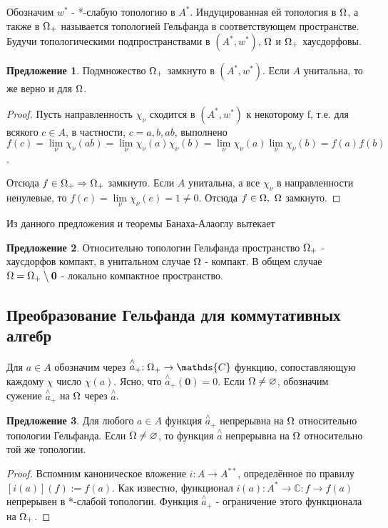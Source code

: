 \documentclass[12pt]{extarticle}
\renewcommand{\setminus}{\mathbin{\big\backslash}}%
\theoremstyle{definition}
\newtheorem{suggestion}{\indent Предложение}[section]
\begin{document}
    Обозначим $w^*$ - *-слабую топологию в $A^*$. Индуцированная ей топология в $\ohm$, а также в $\ohm_+$ называется топологией Гельфанда в соответствующем пространстве. Будучи топологическими подпространствами в $(A^*, w^*)$, $\ohm$ и $\ohm_+$ хаусдорфовы.
    
     \begin{suggestion}
    Подмножество $\ohm_+$ замкнуто в $(A^*, w^*)$. Если $A$ унитальна, то же верно и для $\ohm$.
    \end{suggestion}
    \begin{proof}
    Пусть направленность $\chi_{\nu}$ сходится в $(A^*, w^*)$ к некоторому f, т.е. для всякого $c \in A$, в частности, $c = a, b, ab$, выполнено $f(c) = \lim \limits_{\nu} \chi_{\nu}(ab) = \lim \limits_{\nu} \chi_{\nu}(a)\chi_{\nu}(b) = \lim \limits_{\nu} \chi_{\nu}(a) \lim \limits_{\nu} \chi_{\nu}(b) = f(a)f(b)$.
    
    Отсюда $f\in \ohm_+ \Rightarrow \ohm_+$ замкнуто. Если $A$ унитальна, а все $\chi_{\nu}$ в направленности ненулевые, то $f(e) = \lim \limits_{\nu} \chi_{\nu}(e) = 1 \neq 0$. Отсюда $f \in \ohm,\ \ohm$ замкнуто.
    \end{proof}
    
    Из данного предложения и теоремы Банаха-Алаоглу вытекает 
    
    \begin{suggestion}
    Относительно топологии Гельфанда пространство $\ohm_+$ - хаусдорфов компакт, в унитальном случае $\ohm$ - компакт. В общем случае $\ohm = \ohm_+\setminus \mathbf{0}$ - локально компактное пространство.
    \end{suggestion}
    
    \subsection{Преобразование Гельфанда для коммутативных алгебр}
    
    Для $a \in A$ обозначим через $\stackrel{\wedge}{a}_+: \ohm_+ \rightarrow \mathds{C}$ функцию, сопоставляющую каждому $\chi$ число $\chi(a)$. Ясно, что $\stackrel{\wedge}{a}_+(\mathbf{0}) = 0$. Если $\ohm \neq \varnothing$, обозначим сужение $\stackrel{\wedge}{a}_+$ на $\ohm$ через $\stackrel{\wedge}{a}$.
    
    \begin{suggestion}
    Для любого $a \in A$ функция $\stackrel{\wedge}{a}_+$ непрерывна на $\ohm$ относительно топологии Гельфанда. Если $\ohm \neq \varnothing$, то функция  $\stackrel{\wedge}{a}$ непрерывна на $\ohm$ относительно той же топологии.
    \end{suggestion}
    \begin{proof}
    Вспомним каноническое вложение $i: A \rightarrow A^{**}$, определённое по правилу $[i(a)](f):= f(a)$. Как известно, функционал $i(a): A^{*} \rightarrow \mathds{C}: f \rightarrow f(a)$ непрерывен в *-слабой топологии. Функция $\stackrel{\wedge}{a}_+$ - ограничение этого функционала на $\ohm_+$.
    \end{proof}
    
\end{document}
